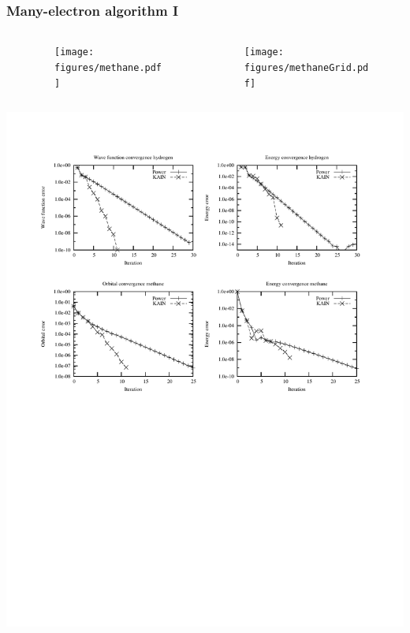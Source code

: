 \begin{frame}
    \frametitle{Many-electron algorithm I}
    \begin{columns}
    \begin{column}[b]{0.20\linewidth}
	\vspace{5mm}
    \end{column}
    \begin{column}[b]{0.30\linewidth}
    \begin{figure}
	\centering
	\texttt{[image: figures/methane.pdf]}\\
	\vspace{5mm}
    \end{figure}
    \end{column}
    \begin{column}[b]{0.50\linewidth}
    \begin{figure}
	\begin{center}
	\texttt{[image: figures/methaneGrid.pdf]}\\
	\end{center}
    \end{figure}
    \end{column}
    \end{columns}
    \begin{center}
	\includegraphics[scale=0.6, clip, viewport = 50 350 550 540]{figures/convergence.pdf}
    \end{center}
\end{frame}

